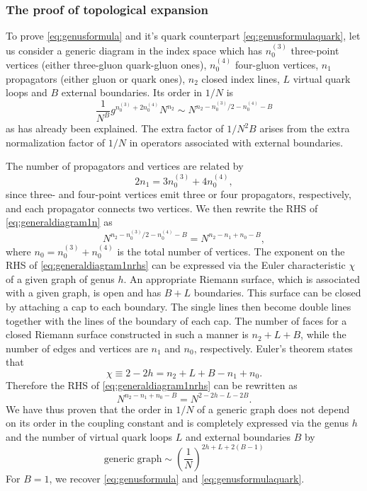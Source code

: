 \subsubsection{The proof of topological expansion}
To prove \eqref{eq:genusformula} and it's quark counterpart
\eqref{eq:genusformulaquark}, let us consider a generic diagram in the index
space which has $n_0^{(3)}$ three-point vertices (either three-gluon
quark-gluon ones), $n_0^{(4)}$ four-gluon vertices, $n_1$ propagators (either
gluon or quark ones), $n_2$ closed index lines, $L$ virtual quark loops
and $B$ external boundaries. Its order in $1/N$ is
\begin{equation}
  \frac{1}{N^B}g^{n_0^{(3)}+2n_0^{(4)}}N^{n_2}\sim N^{n_2 - n_0^{(3)}/2
  - n_0^{(4)} - B}
  \label{eq:generaldiagram1n}
\end{equation}
as has already been explained. The extra factor of $1/N^2B$ arises from
the extra normalization factor of $1/N$ in operators associated with external
boundaries.
\par The number of propagators and vertices are related by
\begin{equation}
  2n_1 = 3n_0^{(3)} + 4n_0^{(4)},
\end{equation}
since three- and four-point vertices emit three or four propagators,
respectively, and each propagator connects two vertices. We then rewrite
the RHS of \eqref{eq:generaldiagram1n} as
\begin{equation}
  N^{n_2 - n_0^{(3)}/2 -n_0^{(4)} - B} = N^{n_2 - n_1 + n_0 -B},
  \label{eq:generaldiagram1nrhs}
\end{equation}
where $n_0 = n_0^{(3)} + n_0^{(4)} $ is the total number of vertices.
The exponent on the RHS of \eqref{eq:generaldiagram1nrhs} can be expressed
via the Euler characteristic $\chi$ of a given graph of genus $h$. An
appropriate Riemann surface, which is associated with a given graph,
is open and has $B+L$ boundaries. This surface can be closed by attaching
a cap to each boundary. The single lines then become double lines 
together with the lines  of the boundary of each cap. The number of faces for
a closed Riemann surface constructed in such a manner is $n_2+L+B$, while
the number of edges and vertices are $n_1$ and $n_0$, respectively. Euler's
theorem states that
\begin{equation}
\chi \equiv 2- 2h = n_2 + L + B -n_1+n_0.
\end{equation}
Therefore the RHS of \eqref{eq:generaldiagram1nrhs} can be rewritten as
\begin{equation}
  N^{n_2-n_1+n_0-B} = N^{2-2h-L-2B}.
\end{equation}
We have thus proven that the order in $1/N$ of a generic graph does
not depend on its order in the coupling constant and is completely 
expressed via the genus $h$ and the number of virtual quark loops $L$ and 
external boundaries $B$ by
\begin{equation}
  \mathrm{generic\;graph}\sim\left(\frac{1}{N}\right)^{2h+L+2(B-1)}
  \label{eq:genericgenusformula}  
\end{equation}
For $B=1$, we recover \eqref{eq:genusformula} and
\eqref{eq:genusformulaquark}.
